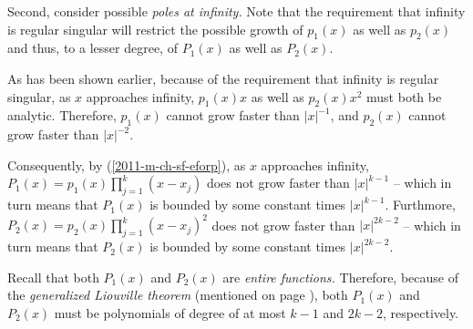 Second, consider possible {\em poles at infinity.}
Note that the requirement that infinity is regular singular will restrict the possible growth of
$p_1(x)$
as well as
$p_2(x)$
and thus, to a lesser degree, of
$P_1(x)$
as well as
$P_2(x)$.

As has been shown earlier,
because of the requirement that infinity is regular singular, as $x$ approaches infinity,
$p_1(x)x$
as well as
$p_2(x)x^2$
must both be analytic.
Therefore,
$p_1(x)$ cannot grow faster than $\vert x \vert^{-1}$,
and
$p_2(x)$ cannot grow faster than $\vert x \vert^{-2}$.

Consequently, by (\ref{2011-m-ch-sf-eforp}),
as $x$ approaches infinity,
$
P_1 (x) = p_1 (x) \prod_{j=1}^k (x-x_j)
$
does not grow faster than $\vert x \vert^{k-1}$ -- which in turn means that $P_1 (x)$ is bounded by some constant times $\vert x \vert^{k-1}$.
Furthmore,
$
P_2 (x) = p_2(x)\prod_{j=1}^k (x-x_j)^2
$
does not grow faster than $\vert x \vert^{2k-2}$
-- which in turn means that $P_2 (x)$ is bounded by some constant times $\vert x \vert^{2k-2}$.


Recall that both $P_1(x)$ and $P_2(x)$ are {\em entire functions.}
Therefore, because of the {\em generalized Liouville theorem}\cite[-50mm]{Greene}
(mentioned on page \pageref{2012-m-ch-ca-lt}),
\label{2014-m-ch-sf-glt}
both
$P_1(x)$ and $P_2(x)$ must be polynomials
of degree of at most $k-1$ and $2k-2$, respectively.

